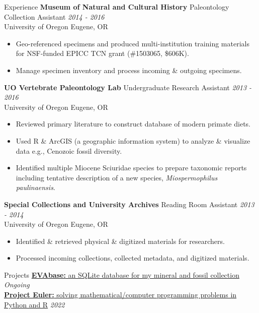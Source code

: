 \documentclass{resume} %
\begin{document}
\begin{rSection}{Experience}
		{\bf Museum of Natural and Cultural History }{Paleontology Collection Assistant} \hfill {\em 2014 - 2016} \\
		{University of Oregon} \hfill {Eugene, OR} 
		\begin{itemize}
			\itemsep -0.5em \vspace{-0.5em} \small
			\item Geo-referenced specimens and produced multi-institution training materials for NSF-funded EPICC TCN grant (\#1503065, \$606K).
			\item Manage specimen inventory and process incoming \& outgoing specimens.
		\end{itemize}
		
		{\bf UO Vertebrate Paleontology Lab }{Undergraduate Research Assistant} \hfill {\em 2013 - 2016} \\
		{University of Oregon} \hfill {Eugene, OR} 
		\begin{itemize}
			\itemsep -0.5em \vspace{-0.5em} \small
			\item Reviewed primary literature to construct database of modern primate diets.
			\item Used R \& ArcGIS (a geographic information system) to analyze \& visualize data e.g., Cenozoic fossil diversity.
			\item Identified multiple Miocene Sciuridae species to prepare taxonomic reports including tentative description of a new species, {\em Miospermophilus paulinaensis}.
		\end{itemize}

		{\bf Special Collections and University Archives }{Reading Room Assistant} \hfill {\em 2013 - 2014} \\
		{University of Oregon} \hfill {Eugene, OR}	
		\begin{itemize}
			\itemsep -0.5em \vspace{-0.5em} \small
			\item Identified \& retrieved physical \& digitized materials for researchers.
			\item Processed incoming collections, collected metadata, and digitized materials.
		\end{itemize}	
	\end{rSection}

	\begin{rSection}{Projects}
		\href{https://github.com/Eva-Biedron/EVAbase}{{\bf EVAbase:} an SQLite database for my mineral and fossil collection} \hfill {\em Ongoing}	\\
		\href{https://github.com/Eva-Biedron/ProjectEuler}{{\bf Project Euler:} solving mathematical/computer programming problems in Python and R} \hfill {\em 2022}	\\
		\\
		\\
	\end{rSection}
\end{document}
